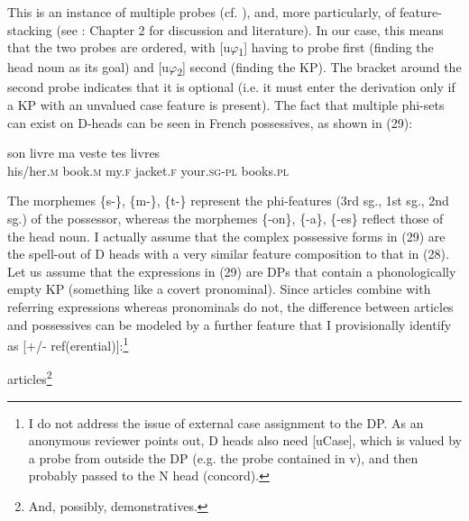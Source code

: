 \documentclass[output=paper]{langsci/langscibook}
\begin{document}
This is an instance of multiple probes (cf. \citealt{Chomsky2008}), and, more particularly, of feature-stacking (see \citealt{Manetta2011}: Chapter 2 for discussion and literature). In our case, this means that the two probes are ordered, with [u$\varphi $\textsubscript{1}] having to probe first (finding the head noun as its goal) and [u$\varphi $\textsubscript{2}] second (finding the KP). The bracket around the second probe indicates that it is optional (i.e. it must enter the derivation only if a KP with an unvalued case feature is present). The fact that multiple phi-sets can exist on D-heads can be seen in French possessives, as shown in (29):

\ea%
    \label{ex:mensch:29}
    \gll   son    livre   \hspace{1.5em} ma  veste  \hspace{1.5em}  tes    livres\\
           his/her.\textsc{m}  book.\textsc{m} {} my.\textsc{f}  jacket.\textsc{f} {} your.\textsc{sg-pl}  books.\textsc{pl}\\
\z

The morphemes \{s-\}, \{m-\}, \{t-\} represent the phi-features (3rd sg., 1st sg., 2nd sg.) of the possessor, whereas the morphemes \{-on\}, \{-a\}, \{-es\} reflect those of the head noun. I actually assume that the complex possessive forms in (29) are the spell-out of D heads with a very similar feature composition to that in (28). Let us assume that the expressions in (29) are DPs that contain a phonologically empty KP (something like a covert pronominal). Since articles combine with referring expressions whereas pronominals do not, the difference between articles and possessives can be modeled by a further feature that I provisionally identify as [+/- ref(erential)]:\footnote{I do not address the issue of external case assignment to the DP. As an anonymous reviewer points out, D heads also need [uCase], which is valued by a probe from outside the DP (e.g. the probe contained in v), and then probably passed to the N head (concord).}

\ea%
    \label{ex:mensch:30}
    \ea articles\footnote{And, possibly, demonstratives.}\\\relax
        
\end{document}
